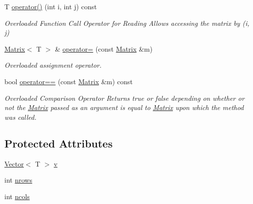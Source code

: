 \begin{DoxyCompactItemize}
T \hyperlink{class_matrix_ae061f61e76c735184b9874cf89023269}{operator()} (int i, int j) const 
\begin{DoxyCompactList}\small\item\em Overloaded Function Call Operator for Reading Allows accessing the matrix by (i, j) \end{DoxyCompactList}\item 
\hyperlink{class_matrix}{Matrix}$<$ T $>$ \& \hyperlink{class_matrix_a110f31ce303d4a399b139f2a5751c525}{operator=} (const \hyperlink{class_matrix}{Matrix} \&m)
\begin{DoxyCompactList}\small\item\em Overloaded assignment operator. \end{DoxyCompactList}\item 
bool \hyperlink{class_matrix_af336aea6955268a9226dfdc819ad8dc2}{operator==} (const \hyperlink{class_matrix}{Matrix} \&m) const 
\begin{DoxyCompactList}\small\item\em Overloaded Comparison Operator Returns true or false depending on whether or not the \hyperlink{class_matrix}{Matrix} passed as an argument is equal to \hyperlink{class_matrix}{Matrix} upon which the method was called. \end{DoxyCompactList}\end{DoxyCompactItemize}
\subsection*{Protected Attributes}
\begin{DoxyCompactItemize}
\item 
\hyperlink{class_vector}{Vector}$<$ T $>$ \hyperlink{class_matrix_a7b1d6b09f3f6fff47c03f63a51a93cd7}{v}
\item 
int \hyperlink{class_matrix_adaa4451e47cf953a563db25d155acbcc}{nrows}
\item 
int \hyperlink{class_matrix_a30b634d02c22a903661761ef74189ae0}{ncols}
\end{DoxyCompactItemize}
